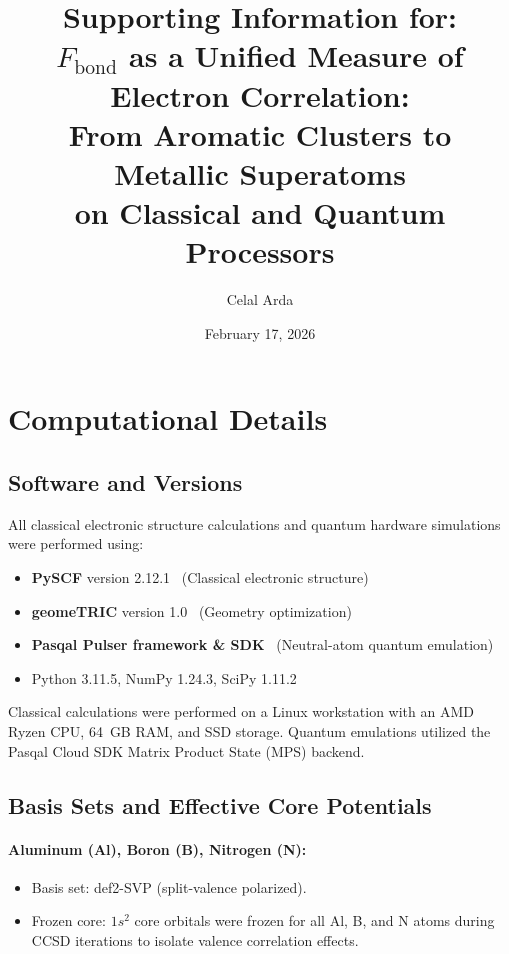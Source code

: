 \documentclass[12pt,a4paper]{article}
\title{%
  Supporting Information for:\\[6pt]
  $F_{\text{bond}}$ as a Unified Measure of Electron Correlation:\\
  From Aromatic Clusters to Metallic Superatoms\\
  on Classical and Quantum Processors%
}
\author{Celal Arda}
\date{February 17, 2026}
\begin{document}
\maketitle
\tableofcontents
\newpage

\section{Computational Details}

\subsection{Software and Versions}

All classical electronic structure calculations and quantum hardware
simulations were performed using:

\begin{itemize}
  \item \textbf{PySCF} version 2.12.1~\cite{sun2018pyscf,sun2020recent}
    (Classical electronic structure)
  \item \textbf{geomeTRIC} version 1.0~\cite{wang2016geometry}
    (Geometry optimization)
  \item \textbf{Pasqal Pulser framework \& SDK}~\cite{henriet2020quantum}
    (Neutral-atom quantum emulation)
  \item Python 3.11.5, NumPy 1.24.3, SciPy 1.11.2
\end{itemize}

Classical calculations were performed on a Linux workstation with an
AMD Ryzen CPU, 64~GB RAM, and SSD storage. Quantum emulations utilized
the Pasqal Cloud SDK Matrix Product State (MPS) backend.

\subsection{Basis Sets and Effective Core Potentials}

\paragraph{Aluminum (Al), Boron (B), Nitrogen (N):}
\begin{itemize}
  \item Basis set: def2-SVP (split-valence polarized).
  \item Frozen core: $1s^2$ core orbitals were frozen for all Al, B,
    and N atoms during CCSD iterations to isolate valence correlation effects.
\end{itemize}
\end{document}
